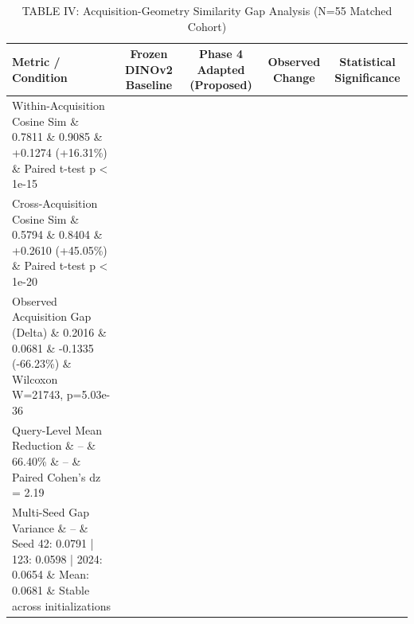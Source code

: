 \begin{table}[t]
\centering
\caption{TABLE IV: Acquisition-Geometry Similarity Gap Analysis (N=55 Matched Cohort)}
\label{tab:table4_acquisition_robustness}
\begin{tabular}{lcccc}
\hline
\textbf{Metric / Condition} & \textbf{Frozen DINOv2 Baseline} & \textbf{Phase 4 Adapted (Proposed)} & \textbf{Observed Change} & \textbf{Statistical Significance} \\
\hline
Within-Acquisition Cosine Sim \& 0.7811 \& 0.9085 \& +0.1274 (+16.31\%) \& Paired t-test p < 1e-15 \\
Cross-Acquisition Cosine Sim \& 0.5794 \& 0.8404 \& +0.2610 (+45.05\%) \& Paired t-test p < 1e-20 \\
Observed Acquisition Gap (Delta) \& 0.2016 \& 0.0681 \& -0.1335 (-66.23\%) \& Wilcoxon W=21743, p=5.03e-36 \\
Query-Level Mean Reduction \& -- \& 66.40\% \& -- \& Paired Cohen's dz = 2.19 \\
Multi-Seed Gap Variance \& -- \& Seed 42: 0.0791 | 123: 0.0598 | 2024: 0.0654 \& Mean: 0.0681 \& Stable across initializations \\
\hline
\end{tabular}
\end{table}
